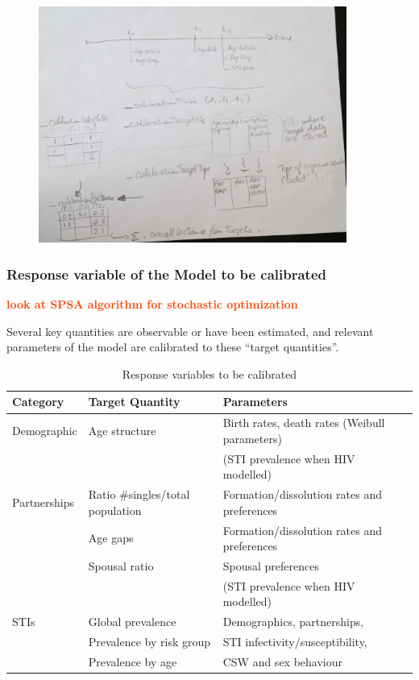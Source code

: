 \documentclass[11pt, onecolumn]{article}
\newcommand{\warning}[1]{\textbf{\textcolor{OrangeRed}{#1}}}
\begin{document}
\begin{figure}[!ht]
\centering
    \includegraphics[angle=0,width=0.9\textwidth]{./figures/calibration_schedule.jpg}
\end{figure}


\subsubsection{Response variable of the Model to be calibrated}

\warning{look at SPSA algorithm for stochastic optimization}

Several key quantities are observable or have been estimated, and relevant parameters of the model are calibrated to these ``target quantities''.
\begin{table}[htdp]
\caption{Response variables to be calibrated}
\begin{center}
\begin{tabular}{lll}

\hline
\textbf{Category} & \textbf{Target Quantity} & \textbf{Parameters} \\

\hline
Demographic  &  Age structure & Birth rates, death rates (Weibull parameters)\\
 & & (STI prevalence when HIV modelled)\\
\hline
Partnerships  &  Ratio \#singles/total population  &  Formation/dissolution rates and preferences \\
  &  Age gaps &   Formation/dissolution rates and preferences  \\
  &  Spousal ratio & Spousal preferences \\
 & & (STI prevalence when HIV modelled)\\
\hline
STIs	& Global prevalence & Demographics, partnerships,\\
	& Prevalence by risk group & STI infectivity/susceptibility,\\
	& Prevalence by age & CSW and sex behaviour\\
\hline
\end{tabular}
\end{center}
\label{default}
\end{table}
\end{document}
